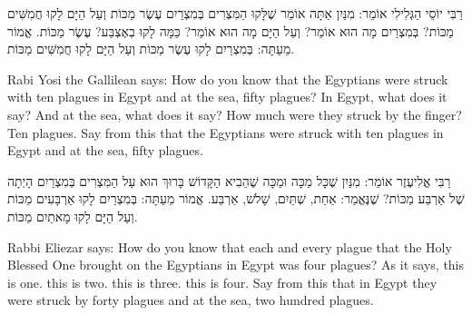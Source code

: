 
רַבִּי יוֹסֵי הַגְּלִילִי אוֹמֵר: מִנַּיִן אַתָּה אוֹמֵר שֶׁלָּקוּ הַמִּצְרִים בְּמִצְרַיִם עֶשֶׂר מַכּוֹת וְעַל הַיָּם לָקוּ חֲמִשִּׁים מַכּוֹת? בְּמִצְרַיִם מָה הוּא אוֹמֵר?
וְעַל הַיָּם מָה הוּא אוֹמֵר?
כַּמָּה לָקוּ בְאֶצְבַּע? עֶשֶׂר מַכּוֹת. אֱמוֹר מֵעַתָּה: בְּמִצְרַיִם לָקוּ עֶשֶׂר מַכּוֹת וְעַל הַיָּם לָקוּ חֲמִשִּׁים מַכּוֹת.

\begin{english}
Rabi Yosi the Gallilean says: How do you know that the Egyptians were struck with ten plagues in Egypt and at the sea, fifty plagues? In Egypt, what does it say?  And at the sea, what does it say?  How much were they struck by the finger? Ten plagues. Say from this that the Egyptians were struck with ten plagues in Egypt and at the sea, fifty plagues.
\end{english}

\vspace{1em}

רַבִּי אֱלִיעֶזֶר אוֹמֵר: מִנַּיִן שֶׁכָּל מַכָּה וּמַכָּה שֶׁהֵבִיא הַקָּדוֹשׁ בָּרוּךְ הוּא עַל הַמִּצְרִים בְּמִצְרַיִם הָיְתָה שֶׁל אַרְבַּע מַכּוֹת? שֶׁנֶּאֱמַר:
אַחַת,
שְׁתַּיִם,
שָׁלשׁ,
אַרְבַּע. אֱמוֹר מֵעַתָּה: בְּמִצְרַיִם לָקוּ אַרְבָּעִים מַכּוֹת וְעַל הַיָּם לָקוּ מָאתַיִם מַכּוֹת.

\begin{english}
Rabbi Eliezar says: How do you know that each and every plague that the Holy Blessed One brought on the Egyptians in Egypt was four plagues? As it says,   this is one.  this is two.  this is three.  this is four. Say from this that in Egypt they were struck by forty plagues and at the sea, two hundred plagues.
\end{english}

